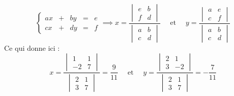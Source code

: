 {\begin{enumerate}
{$$
\left\{\begin{array}{ccccc}ax & + & by & = & e\\ cx & + & dy & = & f  \end{array}\right.
\implies x = \frac{\begin{vmatrix}  e & b \\ f & d\end{vmatrix}}{\begin{vmatrix}  a & b \\ c & d \end{vmatrix}}
\quad \text{ et } \quad y = \frac{\begin{vmatrix}  a & e \\ c & f\end{vmatrix}}{\begin{vmatrix}  a & b \\ c & d \end{vmatrix}}$$
Ce qui donne ici :
$$x = \frac{\begin{vmatrix}  1 & 1 \\ -2 & 7\end{vmatrix}}{\begin{vmatrix}  2 & 1 \\ 3 & 7 \end{vmatrix}} = \frac{9}{11}
 \quad \text{ et } \quad y = \frac{\begin{vmatrix}  2 & 1 \\ 3 & -2 \end{vmatrix}}{\begin{vmatrix}  2 & 1 \\ 3 & 7 \end{vmatrix}} = -\frac{7}{11}$$
}
\end{enumerate}
}
